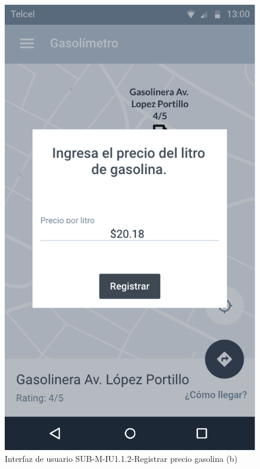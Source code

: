 \begin{figure}[H]
	\centering
	\includegraphics[scale=.55]{Capitulo4/software/submodulos/mediciones/images/sub-m-iu1_1_2_b}
	\caption{Interfaz de usuario SUB-M-IU1.1.2-Registrar precio gasolina (b)}
	\label{fig:sub-m-iu1.1.2.b}
\end{figure}